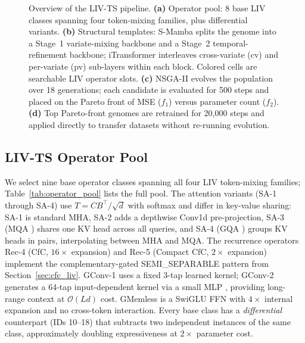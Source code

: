 \begin{figure}[t]
{%
}
\caption{Overview of the LIV-TS pipeline.
  \textbf{(a)} Operator pool: 8 base LIV classes spanning four token-mixing families, plus differential variants.
  \textbf{(b)} Structural templates: S-Mamba splits the genome into a Stage~1 variate-mixing backbone and a Stage~2 temporal-refinement backbone; iTransformer interleaves cross-variate (cv) and per-variate (pv) sub-layers within each block. Colored cells are searchable LIV operator slots.
  \textbf{(c)} NSGA-II evolves the population over 18 generations; each candidate is evaluated for 500 steps and placed on the Pareto front of MSE ($f_1$) versus parameter count ($f_2$).
  \textbf{(d)} Top Pareto-front genomes are retrained for 20{,}000 steps and applied directly to transfer datasets without re-running evolution.}
\label{fig:overview}
\end{figure}

\subsection{LIV-TS Operator Pool}
\label{sec:pool}

We select nine base operator classes spanning all four LIV token-mixing families; Table~\ref{tab:operator_pool} lists the full pool.
The attention variants (SA-1 through SA-4) use $T = CB^\top/\sqrt{d}$ with softmax and differ in key-value sharing: SA-1 is standard MHA, SA-2 adds a depthwise Conv1d pre-projection, SA-3 (MQA \cite{shazeer2019mqattn}) shares one KV head across all queries, and SA-4 (GQA \cite{ainslie2023gqa}) groups KV heads in pairs, interpolating between MHA and MQA.
The recurrence operators Rec-4 (CfC, $16{\times}$ expansion) and Rec-5 (Compact CfC, $2{\times}$ expansion) implement the complementary-gated SEMI\_SEPARABLE pattern from Section~\ref{sec:cfc_liv}.
GConv-1 uses a fixed 3-tap learned kernel; GConv-2 generates a 64-tap input-dependent kernel via a small MLP \cite{poli2023hyena}, providing long-range context at $\mathcal{O}(Ld)$ cost.
GMemless is a SwiGLU FFN \cite{shazeer2020glu} with $4{\times}$ internal expansion and no cross-token interaction.
Every base class has a \emph{differential} counterpart (IDs 10--18) that subtracts two independent instances of the same class, approximately doubling expressiveness at $2{\times}$ parameter cost.

